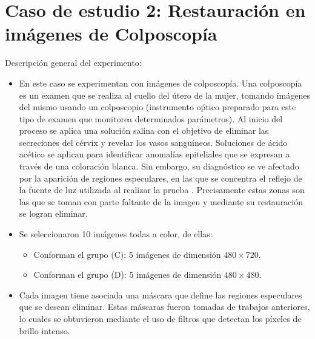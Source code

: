 \section{Caso de estudio 2: Restauraci\'on en im\'agenes de Colposcop\'ia}
Descripci\'on general del experimento:
\begin{itemize}
	\item En este caso se experimentan con im\'agenes de colposcop\'ia. Una colposcop\'ia es un examen que se realiza al cuello del \'utero de la mujer, tomando im\'agenes del mismo usando un colposcopio (instrumento o\'ptico preparado para este tipo de examen que monitorea determinados par\'ametros). Al inicio del proceso se aplica una solución salina con el objetivo de eliminar las secreciones del cérvix y revelar los vasos sanguíneos. Soluciones de ácido acético se aplican para identificar anomalías epiteliales que se expresan a través de una coloración blanca. Sin embargo, su diagnóstico se ve afectado por la aparición de regiones especulares, en las que se concentra el reflejo de la fuente de luz utilizada al realizar la prueba \cite{dgomez2018tesis}. Precisamente estas zonas son las que se toman con parte faltante de la imagen y mediante su restauraci\'on se logran eliminar.
	
	\item Se seleccionaron 10 im\'agenes todas a color, de ellas:
	\begin{itemize}
		\item Conforman el grupo (C): 5 im\'agenes de dimensi\'on $480 \times 720$.
		\item Conforman el grupo (D): 5 im\'agenes de dimensi\'on $480 \times 480$.
	\end{itemize}
	
	\item Cada imagen tiene asociada una m\'ascara que define las regiones especulares que se desean eliminar. Estas m\'ascaras fueron tomadas de trabajos anteriores, lo cuales se obtuvieron mediante el uso de filtros que detectan los p\'ixeles de brillo intenso.
	

\end{itemize}
